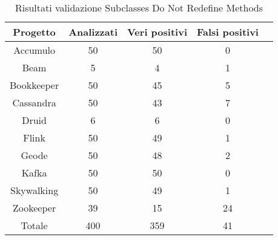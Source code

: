             
            \begin{table}[h]
                \centering
                \begin{tabular}{|c|c|c|c|c|}
                    \hline
                    \textbf{Progetto} & \textbf{Analizzati} & \textbf{Veri positivi} & \textbf{Falsi positivi} \\
                    \hline
                    Accumulo & 50 & 50 & 0 \\
                    Beam & 5 & 4 & 1 \\
                    Bookkeeper & 50 & 45 & 5  \\
                    Cassandra & 50 & 43 & 7 \\
                    Druid & 6 & 6 & 0 \\
                    Flink & 50 & 49 & 1 \\
                    Geode & 50 & 48 & 2 \\
                    Kafka & 50 & 50 & 0 \\
                    Skywalking & 50 & 49 & 1 \\
                    Zookeeper & 39 & 15 & 24 \\
                    \hline
                    Totale & 400 & 359 & 41 \\
                    \hline
                \end{tabular}
                \caption{Risultati validazione Subclasses Do Not Redefine Methods}
                \label{tab:caption}
            \end{table}